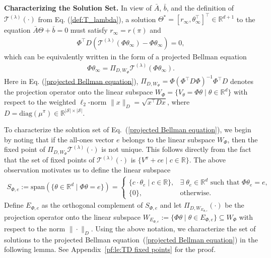 \documentclass[11 pt]{article}
\begin{document}
	
	\vspace{3 mm}
	\noindent\textbf{Characterizing the Solution Set.} 
	In view of $\bar{A}$, $\bar{b}$, and the definition of $\mathcal{T}^{(\lambda)}(\cdot)$ from Eq. (\ref{def:T_lambda}), a solution $\Theta^*=[r_\infty,\theta^\top_\infty]^\top \in\mathbb{R}^{d+1}$ to the equation $\bar{A}\Theta+\bar{b}=0$ must satisfy $r_\infty=r(\pi)$ and 
	\begin{align*}
		\Phi^\top D \left(\mathcal{T}^{(\lambda)} \left(\Phi \theta_\infty \right)-\Phi\theta_\infty\right)=0,
	\end{align*}
	which can be equivalently written in the form of a projected Bellman equation
	\begin{align}\label{projected Bellman equation}
		\Phi \theta_\infty = \Pi_{D,W_{\Phi}} \mathcal{T}^{(\lambda)} \left(\Phi \theta_\infty \right).
	\end{align}
	Here in Eq. (\ref{projected Bellman equation}), $\Pi_{D,W_{\Phi}} = \Phi \left(\Phi^\top D \Phi \right)^{-1} \Phi^\top D$ denotes the projection operator onto the linear subspace $ W_{\Phi} = \{V_\theta = \Phi \theta \mid \theta \in \mathbb{R}^d\} $ with respect to the weighted $\ell_2$-norm $\| x \|_{D} = \sqrt{x^\top D x}$, where $ D = \text{diag}(\mu^\pi) \in \mathbb{R}^{|\mathcal{S}| \times |\mathcal{S}|} $. 
	
	
	To characterize the solution set of Eq.~(\ref{projected Bellman equation}), we begin by noting that if the all-ones vector $ e $ belongs to the linear subspace $ W_{\Phi} $, then the fixed point of $ \Pi_{D,W_{\Phi}} \mathcal{T}^{(\lambda)}(\cdot) $ is not unique. This follows directly from the fact that the set of fixed points of $ \mathcal{T}^{(\lambda)}(\cdot) $ is $ \{V^{\pi} + c e \mid c \in \mathbb{R}\} $. The above observation motivates us to define the linear subspace 
	\begin{align}\label{def:theta_e}
		S_{\Phi, e} := \text{span}(\{\theta \in \mathbb{R}^d \mid \Phi \theta = e \})=
		\begin{cases}
			\{c \cdot \theta_e \mid c \in \mathbb{R}\}, & \exists\; \theta_e \in \mathbb{R}^d \text{ such that } \Phi \theta_e = e, \\
			\{0\}, & \text{otherwise}.
		\end{cases}
	\end{align}
	Define $E_{\Phi, e}$ as the orthogonal complement of $S_{\Phi, e}$ and let $ \Pi_{D,W_{E_{\Phi, e}}}(\cdot) $ be the projection operator onto the linear subspace $ W_{E_{\Phi, e}} := \{\Phi \theta \mid \theta \in E_{\Phi, e}\} \subseteq W_{\Phi} $ with respect to the norm $ \| \cdot \|_{D} $. Using the above notation, we characterize the set of solutions to the projected Bellman equation~(\ref{projected Bellman equation}) in the following lemma. See Appendix~\ref{pf:le:TD fixed points} for the proof.
	
\end{document}
